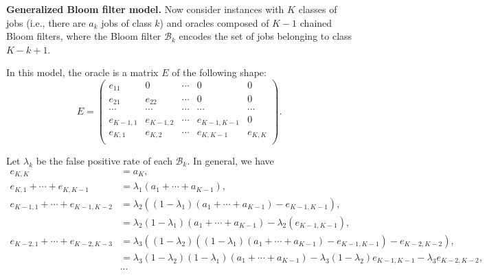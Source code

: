 \documentclass{article}
\begin{document}
\noindent\textbf{Generalized Bloom filter model.}
Now consider instances with \(K\) classes of jobs (i.e., there are \(a_k\) jobs of class \(k\)) and oracles composed of \(K-1\) chained Bloom filters, where the Bloom filter \(\mathcal{B}_k\) encodes the set of jobs belonging to class \(K-k+1\).

In this model, the oracle is a matrix \(E\) of the following shape:
\[
    E=\begin{pmatrix}
        e_{11} & 0      & \cdots & 0 & 0 \\
        e_{21} & e_{22} & \cdots & 0 & 0 \\
        \cdots & \cdots & \cdots & \cdots & \cdots \\
        e_{K-1,1} & e_{K-1,2} & \cdots & e_{K-1,K-1} & 0 \\
        e_{K,1}   & e_{K,2}   & \cdots & e_{K,K-1}   & e_{K,K} \\
    \end{pmatrix}.
\]

Let \(\lambda_k\) be the false positive rate of each \(\mathcal{B}_k\).
In general, we have
\begin{align*}
    e_{K,K}&=a_K, \\
    e_{K,1}+\cdots+e_{K,K-1}&=\lambda_1(a_1+\cdots+a_{K-1}), \\
    e_{K-1,1}+\cdots+e_{K-1,K-2}&=\lambda_2((1-\lambda_1)(a_1+\cdots+a_{K-1})-e_{K-1,K-1}), \\
    &=\lambda_2(1-\lambda_1)(a_1+\cdots+a_{K-1})-\lambda_2(e_{K-1,K-1}), \\
    e_{K-2,1}+\cdots+e_{K-2,K-3}&=\lambda_3((1-\lambda_2)((1-\lambda_1)(a_1+\cdots+a_{K-1})-e_{K-1,K-1})-e_{K-2,K-2}), \\
    &=\lambda_3(1-\lambda_2)(1-\lambda_1)(a_1+\cdots+a_{K-1})-\lambda_3(1-\lambda_2)e_{K-1,K-1}-\lambda_3e_{K-2,K-2}, \\
    &\cdots \\
\end{align*}
\end{document}
